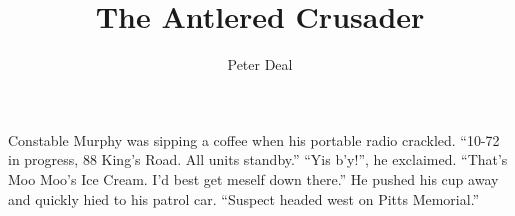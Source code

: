 \documentclass{book}
\title{The Antlered Crusader}
\author{Peter Deal}
\begin{document}
Constable Murphy was sipping a coffee when his portable radio crackled. ``10-72 in progress, 88 King's Road. All units standby.''
``Yis b'y!'', he exclaimed. ``That's Moo Moo's Ice Cream. I'd best get meself down there.''
He pushed his cup away and quickly hied to his patrol car. ``Suspect headed west on Pitts Memorial.''
\end{document}
